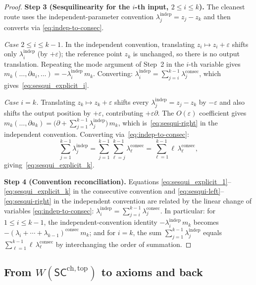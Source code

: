 \begin{proof}
\medskip\noindent
\textbf{Step 3 (Sesquilinearity for the $i$-th input, $2\le i\le k$).}
The cleanest route uses the independent-parameter convention
$\lambda_j^{\mathrm{indep}} = z_j - z_k$ and then converts via
\eqref{eq:indep-to-consec}.

\emph{Case $2\le i\le k-1$.}\;
In the independent convention, translating $z_i\mapsto z_i+\varepsilon$
shifts only $\lambda_i^{\mathrm{indep}}$ (by $+\varepsilon$); the reference
point $z_k$ is unchanged, so there is no output translation.
Repeating the mode argument of Step~2 in the $i$-th variable gives
$m_k(\ldots,\partial a_i,\ldots) = -\lambda_i^{\mathrm{indep}}\,m_k$.
Converting:
$\lambda_i^{\mathrm{indep}} = \sum_{j=i}^{k-1}\lambda_j^{\mathrm{consec}}$,
which gives~\eqref{eq:sesqui_explicit_i}.

\emph{Case $i=k$.}\;
Translating $z_k\mapsto z_k+\varepsilon$ shifts every
$\lambda_j^{\mathrm{indep}} = z_j - z_k$ by $-\varepsilon$ and
also shifts the output position by $+\varepsilon$, contributing
$+\varepsilon\partial$.
The $O(\varepsilon)$ coefficient gives
$m_k(\ldots,\partial a_k)
 = \bigl(\partial + \sum_{j=1}^{k-1}\lambda_j^{\mathrm{indep}}\bigr)\,m_k$,
which is~\eqref{eq:sesqui-right} in the independent convention.
Converting via~\eqref{eq:indep-to-consec}:
\[
 \sum_{j=1}^{k-1}\lambda_j^{\mathrm{indep}}
 = \sum_{j=1}^{k-1}\sum_{\ell=j}^{k-1}\lambda_\ell^{\mathrm{consec}}
 = \sum_{\ell=1}^{k-1}\ell\,\lambda_\ell^{\mathrm{consec}},
\]
giving~\eqref{eq:sesqui_explicit_k}.

\medskip\noindent
\textbf{Step 4 (Convention reconciliation).}
Equations
\eqref{eq:sesqui_explicit_1}--\eqref{eq:sesqui_explicit_k} in the
consecutive convention and
\eqref{eq:sesqui-left}--\eqref{eq:sesqui-right} in the
independent convention are related by the linear change of variables
\eqref{eq:indep-to-consec}:
$\lambda_i^{\mathrm{indep}} = \sum_{j=i}^{k-1}\lambda_j^{\mathrm{consec}}$.
In particular:
for $1\le i\le k-1$, the independent-convention
identity $-\lambda_i^{\mathrm{indep}}\, m_k$ becomes
$-(\lambda_i+\cdots+\lambda_{k-1})^{\mathrm{consec}}\, m_k$;
and for $i=k$, the sum
$\sum_{j=1}^{k-1}\lambda_j^{\mathrm{indep}}$
equals $\sum_{\ell=1}^{k-1}\ell\,\lambda_\ell^{\mathrm{consec}}$
by interchanging the order of summation.
\end{proof}
\subsection{From $W(\mathsf{SC}^{\mathrm{ch,top}})$ to axioms and back}
\label{sec:operad-to-axioms}
\label{sec:equivalence}

